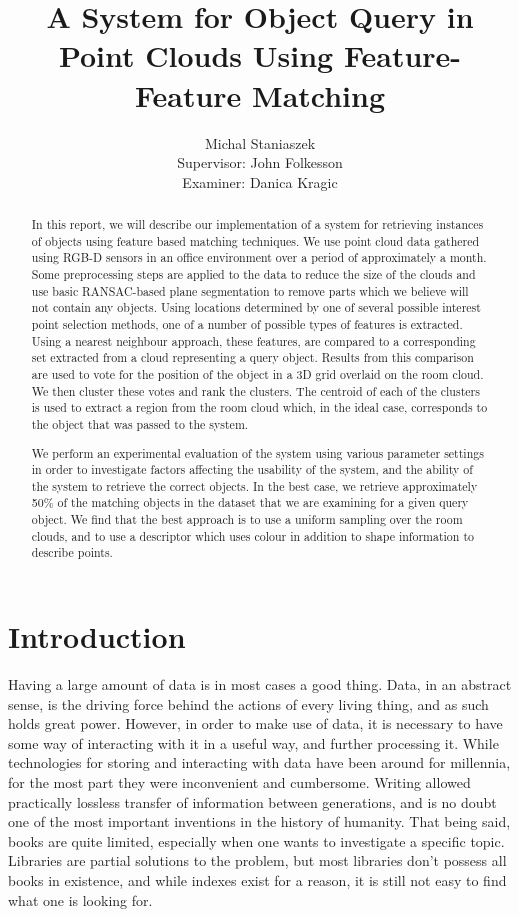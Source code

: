 \documentclass[11pt,a4paper]{kth-mag}
\author{Michal Staniaszek \\  \vskip 3cm Supervisor: John Folkesson \\ Examiner: Danica Kragic}
\title{A System for Object Query in Point Clouds Using Feature-Feature Matching}
\begin{document}
\maketitle
\begin{abstract}
  In this report, we will describe our implementation of a system for retrieving
  instances of objects using feature based matching techniques. We use point
  cloud data gathered using RGB-D sensors in an office environment over a period
  of approximately a month. Some preprocessing steps are applied to the data to
  reduce the size of the clouds and use basic RANSAC-based plane segmentation to
  remove parts which we believe will not contain any objects. Using locations
  determined by one of several possible interest point selection methods, one of
  a number of possible types of features is extracted. Using a nearest neighbour
  approach, these features, are compared to a corresponding set extracted from a
  cloud representing a query object. Results from this comparison are used to
  vote for the position of the object in a 3D grid overlaid on the room cloud.
  We then cluster these votes and rank the clusters. The centroid of each of the
  clusters is used to extract a region from the room cloud which, in the ideal
  case, corresponds to the object that was passed to the system.

  We perform an experimental evaluation of the system using various parameter
  settings in order to investigate factors affecting the usability of the
  system, and the ability of the system to retrieve the correct objects. In the
  best case, we retrieve approximately 50\% of the matching objects in the
  dataset that we are examining for a given query object. We find that the best
  approach is to use a uniform sampling over the room clouds, and to use a
  descriptor which uses colour in addition to shape information to describe
  points.
\end{abstract}
\tableofcontents
\chapter{Introduction}
Having a large amount of data is in most cases a good thing. Data, in an
abstract sense, is the driving force behind the actions of every living thing,
and as such holds great power. However, in order to make use of data, it is
necessary to have some way of interacting with it in a useful way, and further
processing it. While technologies for storing and interacting with data have
been around for millennia, for the most part they were inconvenient and
cumbersome. Writing allowed practically lossless transfer of information between
generations, and is no doubt one of the most important inventions in the history
of humanity. That being said, books are quite limited, especially when one wants
to investigate a specific topic. Libraries are partial solutions to the problem,
but most libraries don't possess all books in existence, and while indexes exist
for a reason, it is still not easy to find what one is looking for.
\end{document}
